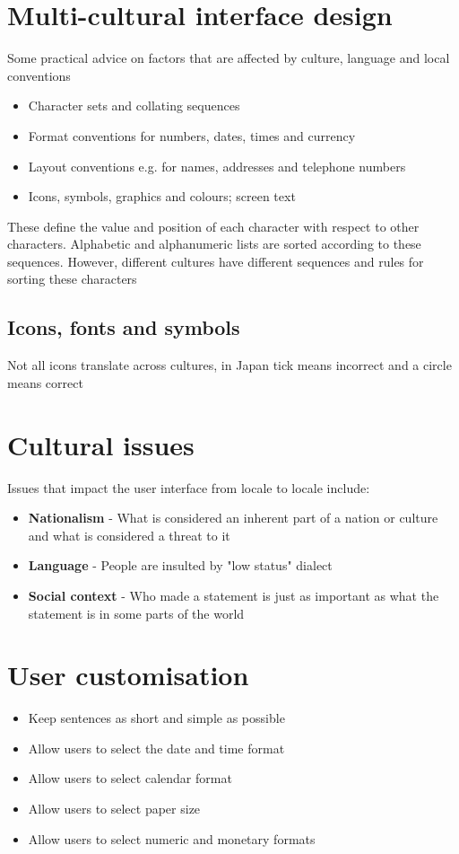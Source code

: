 \documentclass{article}[18pt]
\begin{document}
\section{Multi-cultural interface design}
Some practical advice on factors that are affected by culture, language and local conventions
\begin{itemize}
	\item Character sets and collating sequences
	\item Format conventions for numbers, dates, times and currency
	\item Layout conventions e.g. for names, addresses and telephone numbers
	\item Icons, symbols, graphics and colours; screen text
\end{itemize}
\begin{defin}
These define the value and position of each character with respect to other characters. Alphabetic and alphanumeric lists are sorted according to these sequences. However, different cultures have different sequences and rules for sorting these characters
\end{defin}
\subsection{Icons, fonts and symbols}
Not all icons translate across cultures, in Japan tick means incorrect and a circle means correct
\section{Cultural issues}
Issues that impact the user interface from locale to locale include:
\begin{itemize}
	\item \textbf{Nationalism} - What is considered an inherent part of a nation or culture and what is considered a threat to it
	\item \textbf{Language} - People are insulted by "low status" dialect
	\item \textbf{Social context} - Who made a statement is just as important as what the statement is in some parts of the world
\end{itemize}
\section{User customisation}
\begin{itemize}
	\item Keep sentences as short and simple as possible
	\item Allow users to select the date and time format
	\item Allow users to select calendar format
	\item Allow users to select paper size
	\item Allow users to select numeric and monetary formats
\end{itemize}
\end{document}
